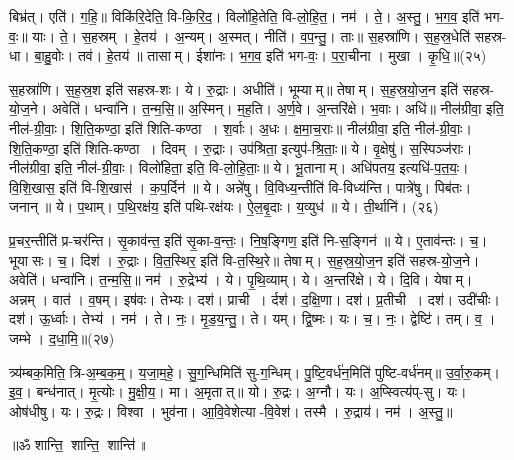 बिभ्र॑त्। एति॑। ग॒हि॒॥ 
विकि॑रि॒देति॒ वि-कि॒रि॒द॒। विलो॑हि॒तेति॒ वि-लो॒हि॒त॒। नम॑। ते॒। अ॒स्तु॒। भ॒ग॒व॒ इति॑ भग-वः॒॥ 
याः। ते॒। स॒हस्रम्। हे॒तय॑। अ॒न्यम्। अ॒स्मत्। नीति॑। व॒प॒न्तु॒। ताः॥ 
स॒हस्रा॑णि। स॒ह॒स्र॒धेति॑ सहस्र-धा। बा॒हु॒वोः। तव॑। हे॒तय॑॥ 
तासाम्। ईशा॑नः। भ॒ग॒व॒ इति॑ भग-वः॒। प॒रा॒चीना। मुखा। कृ॒धि॒॥(२५)


स॒हस्रा॑णि। स॒ह॒स्र॒श इति॑ सहस्र-शः। ये। रु॒द्राः। अधीति॑। भूम्याम्॥ 
तेषाम्। स॒ह॒स्र॒यो॒ज॒न इति॑ सहस्र-यो॒ज॒ने। अवेति॑। धन्वा॑नि। त॒न्म॒सि॒॥ 
अ॒स्मिन्। म॒ह॒ति। अ॒र्ण॒वे। अ॒न्तरि॑क्षे। भ॒वाः। अधि॑॥ 
नील॑ग्रीवा॒ इति॒ नील॑-ग्री॒वाः॒। शि॒ति॒कण्ठा॒ इति॑ शिति-कण्ठा। श॒र्वाः। अ॒धः। क्ष॒मा॒च॒राः॥ 
नील॑ग्रीवा॒ इति॒ नील॑-ग्री॒वाः॒। शि॒ति॒कण्ठा॒ इति॑ शिति-कण्ठा। दिवम्। रु॒द्राः। उप॑श्रिता॒ इत्युप॑-श्रि॒ताः॒॥ 
ये। वृ॒क्षेषु॑। स॒स्पिञ्ज॑राः। नील॑ग्रीवा॒ इति॒ नील॑-ग्री॒वाः॒। विलो॑हिता॒ इति॒ वि-लो॒हि॒ताः॒॥ 
ये। भू॒तानाम्। अधि॑पतय॒ इत्यधि॑-प॒त॒यः॒। वि॒शि॒खास॒ इति॑ वि-शि॒खास॑। क॒प॒र्दिन॑॥ 
ये। अन्ने॑षु। वि॒विध्य॒न्तीति॑ वि-विध्य॑न्ति। पात्रे॑षु। पिब॑तः। जनान्॥ 
ये। प॒थाम्। प॒थि॒रक्ष॑य॒ इति॑ पथि-रक्ष॑यः। ऐ॒ल॒बृ॒दाः। य॒व्युध॑॥ 
ये। ती॒र्थानि॑। (२६)


प्र॒चर॒न्तीति॑ प्र-चर॑न्ति। सृ॒काव॑न्त॒ इति॑ सृ॒का-व॒न्तः॒। नि॒ष॒ङ्गिण॒ इति॑ नि-स॒ङ्गिन॑॥ 
ये। ए॒ताव॑न्तः। च॒। भूयासः। च॒। दिश॑। रु॒द्राः। वि॒त॒स्थिर॒ इति॑ वि-त॒स्थि॒रे॥ 
तेषाम्। स॒ह॒स्र॒यो॒ज॒न इति॑ सहस्र-यो॒ज॒ने। अवेति॑। धन्वा॑नि। त॒न्म॒सि॒॥ 
नम॑। रु॒द्रेभ्य॑। ये। पृ॒थि॒व्याम्। ये। अ॒न्तरि॑क्षे। ये। दि॒वि। येषाम्। अन्नम्। वात॑। व॒\ar{}षम्।
 इष॑वः। तेभ्यः। दश॑। प्राची। र्दश॑। द॒क्षि॒णा। दश॑। प्र॒तीची। दश॑। उदी॑चीः। दश॑। ऊ॒र्ध्वाः।
  तेभ्य॑। नम॑। ते। नः॒। मृ॒ड॒य॒न्तु॒। ते। यम्। द्वि॒ष्मः। यः। च॒। नः॒। द्वेष्टि॑। तम्। व॒। जम्भे। द॒धा॒मि॒॥(२७)

त्र्य॑म्बक॒मिति॒ त्रि-अ॒म्ब॒क॒म्॒। य॒जा॒म॒हे॒। सु॒ग॒न्धिमिति॑ सु-ग॒न्धिम्। पु॒ष्टि॒वर्ध॑न॒मिति॑ पुष्टि-वर्ध॑नम्॥ 
उ॒र्वा॒रु॒कम्। इ॒व॒। बन्ध॑नात्। मृ॒त्योः। मु॒क्षी॒य॒। मा। अ॒मृतात्॥ 
यो। रु॒द्रः। अ॒ग्नौ। यः। अ॒प्स्वित्य॑प्-सु। यः। ओष॑धीषु। यः। रु॒द्रः। विश्वा। भुव॑ना। आ॒वि॒वेशेत्या-वि॒वेश॑। तस्मै। रु॒द्राय॑। नम॑। अ॒स्तु॒॥

\centerline{॥ॐ शान्ति॒ शान्ति॒ शान्ति॑॥}


